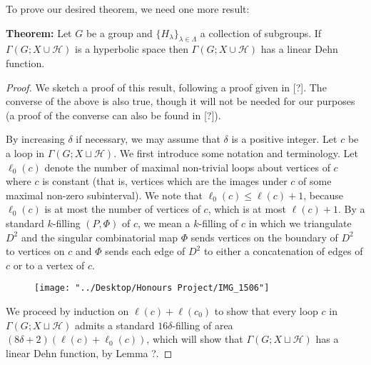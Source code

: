 \documentclass[12pt]{article}
\newcommand{\vs}{\vskip10pt}
\begin{document}
	To prove our desired theorem, we need one more result:
	
	\vs 
	
	\textbf{Theorem: } Let $G$ be a group and $\{H_{\lambda}\}_{\lambda \in \Lambda}$ a collection of subgroups. If $\Gamma(G; X \cup \mathcal{H})$ is a hyperbolic space then $\Gamma(G; X \cup \mathcal{H})$ has a linear Dehn function. 
	
	\begin{proof}
		
		We sketch a proof of this result, following a proof given in [?]. The converse of the above is also true, though it will not be needed for our purposes (a proof of the converse can also be found in [?]). 
		
		\vs 
		
		By increasing $\delta$ if necessary, we may assume that $\delta$ is a positive integer. Let $c$ be a loop in $\Gamma(G; X \sqcup \mathcal{H})$. We first introduce some notation and terminology. Let $\ell_0(c)$ denote the number of maximal non-trivial loops about vertices of $c$ where $c$ is constant (that is, vertices which are the images under $c$ of some maximal non-zero subinterval). We note that $\ell_0(c) \leq \ell(c) + 1$, because $\ell_0(c)$ is at most the number of vertices of $c$, which is at most $\ell(c) + 1$. By a standard $k$-filling $(P, \Phi)$ of $c$, we mean a $k$-filling of $c$ in which we triangulate $D^2$ and the singular combinatorial map $\Phi$ sends vertices on the boundary of $D^2$ to vertices on $c$ and $\Phi$ sends each edge of $D^2$ to either a concatenation of edges of $c$ or to a vertex of $c$. 
		
	
\begin{figure} [h]
	\centering
	\texttt{[image: "../Desktop/Honours Project/IMG\_1506"]}
	\caption{}
	\label{fig:img1506}
\end{figure}
		
		\vs 
		
		We proceed by induction on $\ell(c) + \ell(c_0)$ to show that every loop $c$ in $\Gamma(G; X \sqcup \mathcal{H})$ admits a standard $16\delta$-filling of area $(8 \delta + 2)(\ell(c) + \ell_0(c))$, which will show that $\Gamma(G; X \sqcup \mathcal{H})$ has a linear Dehn function, by Lemma ?. 
		
		\vs 
		

\end{proof}
\end{document}
